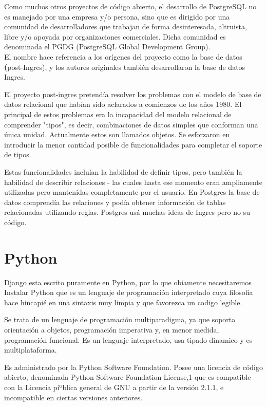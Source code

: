 Como muchos otros proyectos de código abierto, el desarrollo de PostgreSQL no es manejado por una empresa y/o persona, sino que es dirigido por una comunidad de desarrolladores que trabajan de forma desinteresada, altruista, libre y/o apoyada por organizaciones comerciales. Dicha comunidad es denominada el PGDG (PostgreSQL Global Development Group).\\[0.1cm]

El nombre hace referencia a los orígenes del proyecto como la base de datos \textbf(post-Ingres), y los autores originales también desarrollaron la base de datos Ingres.

El proyecto post-ingres pretendía resolver los problemas con el modelo de base de datos relacional que habían sido aclarados a comienzos de los años 1980. El principal de estos problemas era la incapacidad del modelo relacional de comprender "tipos", es decir, combinaciones de datos simples que conforman una única unidad. Actualmente estos son llamados objetos. Se esforzaron en introducir la menor cantidad posible de funcionalidades para completar el soporte de tipos. 

Estas funcionalidades incluían la habilidad de definir tipos, pero también la habilidad de describir relaciones - las cuales hasta ese momento eran ampliamente utilizadas pero mantenidas completamente por el usuario. En Postgres la base de datos comprendía las relaciones y podía obtener información de tablas relacionadas utilizando reglas. Postgres usá muchas ideas de Ingres pero no su código.



\section{Python}

Django esta escrito puramente en Python, por lo que obiamente necesitaremos Instalar Python que es un lenguaje de programación interpretado cuya filosofia hace  hincapié en una sintaxis muy limpia y que favorezca un codigo legible.
 
Se trata de un lenguaje de programación multiparadigma, ya que soporta orientación a objetos, programación imperativa y, en menor medida, programación funcional. Es un lenguaje interpretado, usa tipado dinamico y es multiplataforma.

Es administrado por la Python Software Foundation. Posee una licencia de código abierto, denominada Python Software Foundation License,1 que es compatible con la Licencia píºblica general de GNU a partir de la versión 2.1.1, e incompatible en ciertas versiones anteriores.

